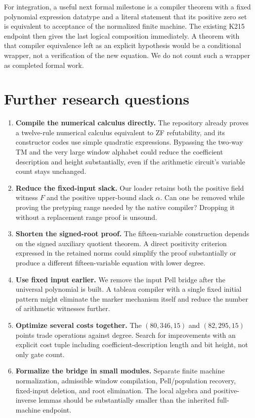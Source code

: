 \documentclass[11pt]{article}
\theoremstyle{remark}\newtheorem{remark}[theorem]{Remark}
\begin{document}
For integration, a useful next formal milestone is a compiler theorem with a fixed polynomial expression datatype and a literal statement that its positive zero set is equivalent to acceptance of the normalized finite machine. The existing K215 endpoint then gives the last logical composition immediately. A theorem with that compiler equivalence left as an explicit hypothesis would be a conditional wrapper, not a verification of the new equation. We do not count such a wrapper as completed formal work.

\section{Further research questions}

\begin{enumerate}[leftmargin=*,itemsep=4pt]
\item \textbf{Compile the numerical calculus directly.} The repository already proves a twelve-rule numerical calculus equivalent to ZF refutability, and its constructor codes use simple quadratic expressions. Bypassing the two-way TM and the very large window alphabet could reduce the coefficient description and height substantially, even if the arithmetic circuit's variable count stays unchanged.
\item \textbf{Reduce the fixed-input slack.} Our loader retains both the positive field witness $F$ and the positive upper-bound slack $\alpha$. Can one be removed while proving the pretyping range needed by the native compiler? Dropping it without a replacement range proof is unsound.
\item \textbf{Shorten the signed-root proof.} The fifteen-variable construction depends on the signed auxiliary quotient theorem. A direct positivity criterion expressed in the retained norms could simplify the proof substantially or produce a different fifteen-variable equation with lower degree.
\item \textbf{Use fixed input earlier.} We remove the input Pell bridge after the universal polynomial is built. A tableau compiler with a single fixed initial pattern might eliminate the marker mechanism itself and reduce the number of arithmetic witnesses further.
\item \textbf{Optimize several costs together.} The $(80,346,15)$ and $(82,295,15)$ points trade operations against degree. Search for improvements with an explicit cost tuple including coefficient-description length and bit height, not only gate count.
\item \textbf{Formalize the bridge in small modules.} Separate finite machine normalization, admissible window compilation, Pell/population recovery, fixed-input deletion, and root elimination. The local algebra and positive-inverse lemmas should be substantially smaller than the inherited full-machine endpoint.
\end{enumerate}
\end{document}
